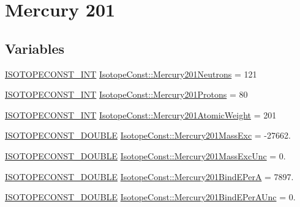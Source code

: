 \hypertarget{group___isotope_const-_mercury-_hg201}{}\section{Mercury 201}
\label{group___isotope_const-_mercury-_hg201}
\subsection*{Variables}
\begin{DoxyCompactItemize}
\item 
\mbox{\hyperlink{group___isotope_const-_macros_ga5f18360b3e99483a35c32d789e62621c}{I\+S\+O\+T\+O\+P\+E\+C\+O\+N\+S\+T\+\_\+\+I\+NT}} \mbox{\hyperlink{group___isotope_const-_mercury-_hg201_ga1f83f67abf0c6c0d53a944cc51497bbb}{Isotope\+Const\+::\+Mercury201\+Neutrons}} = 121
\item 
\mbox{\hyperlink{group___isotope_const-_macros_ga5f18360b3e99483a35c32d789e62621c}{I\+S\+O\+T\+O\+P\+E\+C\+O\+N\+S\+T\+\_\+\+I\+NT}} \mbox{\hyperlink{group___isotope_const-_mercury-_hg201_gaa08b0d298f95a8ba6aec3cc977f46541}{Isotope\+Const\+::\+Mercury201\+Protons}} = 80
\item 
\mbox{\hyperlink{group___isotope_const-_macros_ga5f18360b3e99483a35c32d789e62621c}{I\+S\+O\+T\+O\+P\+E\+C\+O\+N\+S\+T\+\_\+\+I\+NT}} \mbox{\hyperlink{group___isotope_const-_mercury-_hg201_gaad5dd2a9a78267fbe5a58549e4e68c5f}{Isotope\+Const\+::\+Mercury201\+Atomic\+Weight}} = 201
\item 
\mbox{\hyperlink{group___isotope_const-_macros_ga8f45a7272ce02c0b4c65c44636ed719a}{I\+S\+O\+T\+O\+P\+E\+C\+O\+N\+S\+T\+\_\+\+D\+O\+U\+B\+LE}} \mbox{\hyperlink{group___isotope_const-_mercury-_hg201_ga72875278baee3f2c52f011faabbb351b}{Isotope\+Const\+::\+Mercury201\+Mass\+Exc}} = -\/27662.
\item 
\mbox{\hyperlink{group___isotope_const-_macros_ga8f45a7272ce02c0b4c65c44636ed719a}{I\+S\+O\+T\+O\+P\+E\+C\+O\+N\+S\+T\+\_\+\+D\+O\+U\+B\+LE}} \mbox{\hyperlink{group___isotope_const-_mercury-_hg201_ga3e632a2bb6d003951c5b14b2f53b088f}{Isotope\+Const\+::\+Mercury201\+Mass\+Exc\+Unc}} = 0.
\item 
\mbox{\hyperlink{group___isotope_const-_macros_ga8f45a7272ce02c0b4c65c44636ed719a}{I\+S\+O\+T\+O\+P\+E\+C\+O\+N\+S\+T\+\_\+\+D\+O\+U\+B\+LE}} \mbox{\hyperlink{group___isotope_const-_mercury-_hg201_ga028896ebaa20fd5eed0e697ac6767bd7}{Isotope\+Const\+::\+Mercury201\+Bind\+E\+PerA}} = 7897.
\item 
\mbox{\hyperlink{group___isotope_const-_macros_ga8f45a7272ce02c0b4c65c44636ed719a}{I\+S\+O\+T\+O\+P\+E\+C\+O\+N\+S\+T\+\_\+\+D\+O\+U\+B\+LE}} \mbox{\hyperlink{group___isotope_const-_mercury-_hg201_gafaddb2ca26bca56e667c56fed6168af1}{Isotope\+Const\+::\+Mercury201\+Bind\+E\+Per\+A\+Unc}} = 0.

\end{DoxyCompactItemize}
